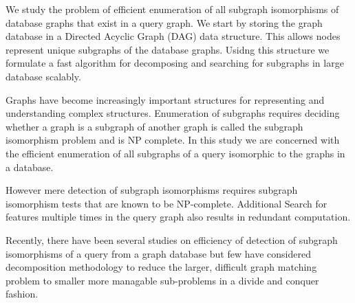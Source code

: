 
We study the problem of efficient enumeration of all subgraph isomorphisms of database graphs that exist in a query graph. We start by storing the graph database in a Directed Acyclic Graph (DAG) data structure. This allows  nodes represent unique subgraphs of the database graphs. Usidng this structure we formulate a fast algorithm for decomposing and searching for subgraphs in large database scalably.

Graphs have become increasingly important structures for representing and understanding complex structures. Enumeration of subgraphs requires deciding whether a graph is a subgraph of another graph is called the subgraph isomorphism problem and is NP complete. In this study we are concerned with the efficient enumeration of all subgraphs of a query isomorphic to the graphs in a database. 

However mere detection of subgraph isomorphisms requires subgraph isomorphism tests that are known to be NP-complete. Additional Search for features multiple times in the query graph also results in redundant computation.

Recently, there have been several studies on efficiency of detection of subgraph isomorphisms of a query from a graph database but few have considered decomposition methodology to reduce the larger, difficult graph matching problem to smaller more managable sub-problems in a divide and conquer fashion. 


